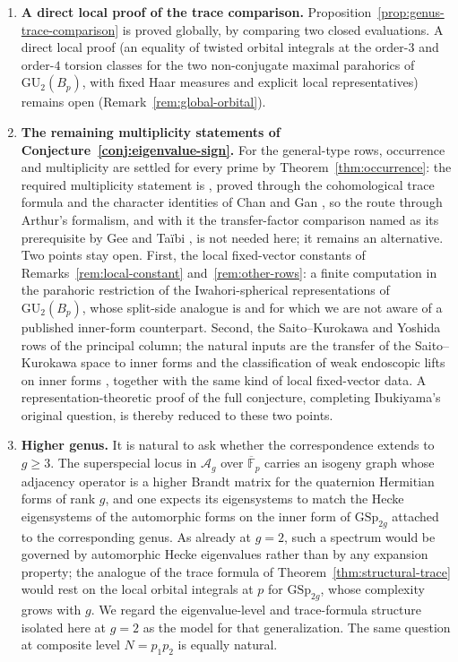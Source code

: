 \documentclass[11pt]{amsart}
\theoremstyle{plain}
\theoremstyle{definition}
\newcommand{\F}{\mathbb{F}}
\newcommand{\GU}{\mathrm{GU}}
\newcommand{\GSp}{\mathrm{GSp}}
\begin{document}
	\begin{enumerate}[label=\textup{(\arabic*)},leftmargin=2.4em]
		\item \textbf{A direct local proof of the trace comparison.}
		Proposition~\ref{prop:genus-trace-comparison} is proved globally, by
		comparing two closed evaluations. A direct local proof (an equality of
		twisted orbital integrals at the order-$3$ and order-$4$ torsion classes
		for the two non-conjugate maximal parahorics of $\GU_2(B_p)$, with fixed
		Haar measures and explicit local representatives) remains open
		(Remark~\ref{rem:global-orbital}).
		
		\item \textbf{The remaining multiplicity statements of
			Conjecture~\ref{conj:eigenvalue-sign}.} For the general-type rows,
		occurrence and multiplicity are settled for every prime by
		Theorem~\ref{thm:occurrence}: the required multiplicity statement is
		\cite[Thm.~11.4]{RoesnerWeissauer2021}, proved through the
		cohomological trace formula and the character identities of Chan and
		Gan \cite{ChanGan2015}, so the route through Arthur's formalism, and
		with it the transfer-factor comparison named as its prerequisite by
		Gee and Ta\"ibi \cite[Rem.~7.4.8]{GeeTaibi}, is not needed here; it
		remains an alternative. Two points stay open. First, the local
		fixed-vector constants of Remarks~\ref{rem:local-constant}
		and~\ref{rem:other-rows}: a finite computation in the parahoric
		restriction of the Iwahori-spherical representations of
		$\GU_2(B_p)$, whose split-side analogue is \cite{Roesner2016} and
		for which we are not aware of a published inner-form counterpart.
		Second, the Saito--Kurokawa and Yoshida rows of the principal
		column; the natural inputs are the transfer of the Saito--Kurokawa
		space to inner forms \cite{GanSK2008} and the classification of weak
		endoscopic lifts on inner forms \cite[\S3]{ChanGan2015}, together
		with the same kind of local fixed-vector data. A
		representation-theoretic proof of the full conjecture, completing
		Ibukiyama's original question, is thereby reduced to these two
		points.
		
		\item \textbf{Higher genus.} It is natural to ask whether the
		correspondence extends to $g\ge3$. The superspecial locus in
		$\mathcal{A}_g$ over $\overline{\F}_p$ carries an isogeny graph whose
		adjacency operator is a higher Brandt matrix for the quaternion Hermitian
		forms of rank $g$, and one expects its eigensystems to match the Hecke
		eigensystems of the automorphic forms on the inner form of $\GSp_{2g}$
		attached to the corresponding genus. As already at $g=2$, such a spectrum
		would be governed by automorphic Hecke eigenvalues rather than by any
		expansion property; the analogue of the trace formula of
		Theorem~\ref{thm:structural-trace} would rest on the local orbital
		integrals at $p$ for $\GSp_{2g}$, whose complexity grows with $g$. We
		regard the eigenvalue-level and trace-formula structure isolated here at
		$g=2$ as the model for that generalization. The same question at composite
		level $N=p_1p_2$ is equally natural.
	\end{enumerate}
	
\end{document}
